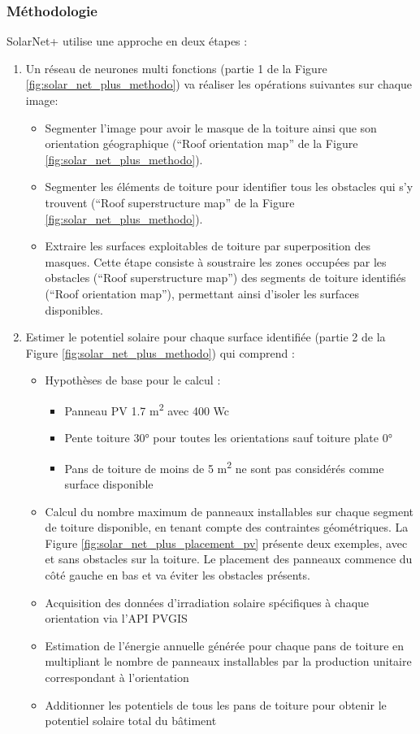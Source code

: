 \subsubsection{Méthodologie}
\par{SolarNet+ utilise une approche en deux étapes :}
\begin{enumerate}
    \item Un réseau de neurones multi fonctions (partie 1 de la Figure \ref{fig:solar_net_plus_methodo}) va réaliser les opérations suivantes sur chaque image:
    \begin{itemize}
        \item Segmenter l'image pour avoir le masque de la toiture ainsi que son orientation géographique (``Roof orientation map'' de la Figure \ref{fig:solar_net_plus_methodo}).
        \item Segmenter les éléments de toiture pour identifier tous les obstacles qui s'y trouvent (``Roof superstructure map'' de la Figure \ref{fig:solar_net_plus_methodo}).
        \item Extraire les surfaces exploitables de toiture par superposition des masques. Cette étape consiste à soustraire les zones occupées par les obstacles (``Roof superstructure map'') des segments de toiture identifiés (``Roof orientation map''), permettant ainsi d'isoler les surfaces disponibles.
    \end{itemize}
    \item Estimer le potentiel solaire pour chaque surface identifiée (partie 2 de la Figure \ref{fig:solar_net_plus_methodo}) qui comprend :
    \begin{itemize}
        \item Hypothèses de base pour le calcul :
        \begin{itemize}
            \item Panneau PV 1.7 \si{\unit{\square\meter}} avec 400 Wc
            \item Pente toiture 30° pour toutes les orientations sauf toiture plate 0°
            \item Pans de toiture de moins de 5 \si{\unit{\square\meter}} ne sont pas considérés comme surface disponible
        \end{itemize}
        \item Calcul du nombre maximum de panneaux installables sur chaque segment de toiture disponible, en tenant compte des contraintes géométriques. La Figure \ref{fig:solar_net_plus_placement_pv} présente deux exemples, avec et sans obstacles sur la toiture. Le placement des panneaux commence du côté gauche en bas et va éviter les obstacles présents.
        \item Acquisition des données d'irradiation solaire spécifiques à chaque orientation via l'API PVGIS
        \item Estimation de l'énergie annuelle générée pour chaque pans de toiture en multipliant le nombre de panneaux installables par la production unitaire correspondant à l'orientation
        \item Additionner les potentiels de tous les pans de toiture pour obtenir le potentiel solaire total du bâtiment
    \end{itemize}
\end{enumerate}

